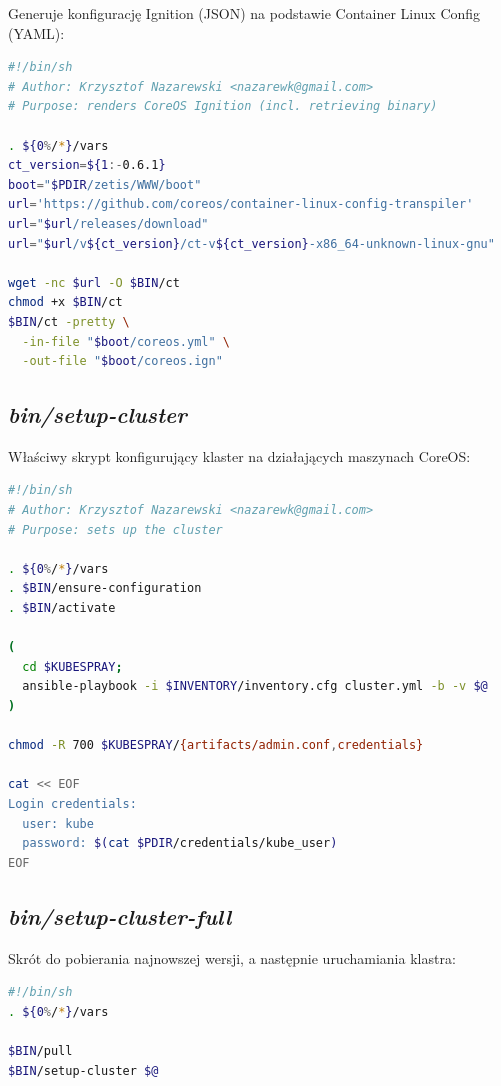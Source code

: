\documentclass[a4paper,12pt,twoside,openany]{report}
\begin{document}
Generuje konfigurację Ignition (JSON) na podstawie Container Linux
Config (YAML):

\begin{lstlisting}[language=bash]
#!/bin/sh
# Author: Krzysztof Nazarewski <nazarewk@gmail.com>
# Purpose: renders CoreOS Ignition (incl. retrieving binary)

. ${0%/*}/vars
ct_version=${1:-0.6.1}
boot="$PDIR/zetis/WWW/boot"
url='https://github.com/coreos/container-linux-config-transpiler'
url="$url/releases/download"
url="$url/v${ct_version}/ct-v${ct_version}-x86_64-unknown-linux-gnu"

wget -nc $url -O $BIN/ct
chmod +x $BIN/ct
$BIN/ct -pretty \
  -in-file "$boot/coreos.yml" \
  -out-file "$boot/coreos.ign"
\end{lstlisting}

\newpage

\hypertarget{binsetup-cluster}{%
\subsection{\texorpdfstring{\emph{bin/setup-cluster}}{bin/setup-cluster}}\label{binsetup-cluster}}

Właściwy skrypt konfigurujący klaster na działających maszynach CoreOS:

\begin{lstlisting}[language=bash]
#!/bin/sh
# Author: Krzysztof Nazarewski <nazarewk@gmail.com>
# Purpose: sets up the cluster

. ${0%/*}/vars
. $BIN/ensure-configuration
. $BIN/activate

(
  cd $KUBESPRAY;
  ansible-playbook -i $INVENTORY/inventory.cfg cluster.yml -b -v $@
)

chmod -R 700 $KUBESPRAY/{artifacts/admin.conf,credentials}

cat << EOF
Login credentials:
  user: kube
  password: $(cat $PDIR/credentials/kube_user)
EOF
\end{lstlisting}

\hypertarget{binsetup-cluster-full}{%
\subsection{\texorpdfstring{\emph{bin/setup-cluster-full}}{bin/setup-cluster-full}}\label{binsetup-cluster-full}}

Skrót do pobierania najnowszej wersji, a następnie uruchamiania klastra:

\begin{lstlisting}[language=bash]
#!/bin/sh
. ${0%/*}/vars

$BIN/pull
$BIN/setup-cluster $@
\end{lstlisting}
\end{document}
